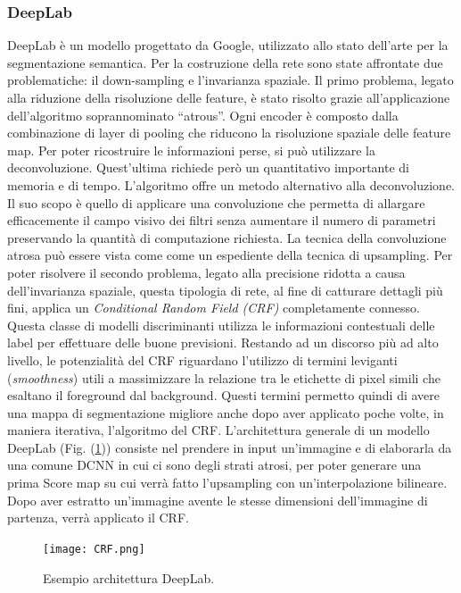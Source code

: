 \subsubsection{DeepLab}\label{DeepL}
DeepLab è un modello progettato da Google, utilizzato allo stato dell'arte 
per la segmentazione semantica. Per la costruzione della rete sono state 
affrontate due problematiche: il down-sampling e l'invarianza spaziale. Il 
primo problema, legato alla riduzione della risoluzione delle feature, è stato 
risolto grazie all'applicazione dell'algoritmo soprannominato “atrous”. Ogni 
encoder è composto dalla combinazione di layer di pooling che riducono 
la risoluzione spaziale delle feature map. Per poter ricostruire le informazioni 
perse, si può utilizzare la deconvoluzione. Quest'ultima richiede però un 
quantitativo importante di memoria e di tempo. L'algoritmo offre un 
metodo alternativo alla deconvoluzione. Il suo scopo è quello di applicare 
una convoluzione che permetta di allargare efficacemente il campo visivo 
dei filtri senza aumentare il numero di parametri preservando la quantità di 
computazione richiesta. La tecnica della convoluzione atrosa può essere vista 
come come un espediente della tecnica di upsampling. Per poter risolvere 
il secondo problema, legato alla precisione ridotta a causa dell'invarianza 
spaziale, questa tipologia di rete, al fine di catturare dettagli più fini, applica 
un \emph{Conditional Random Field (CRF)} completamente connesso. Questa 
classe di modelli discriminanti utilizza le informazioni contestuali delle label 
per effettuare delle buone previsioni. Restando ad un discorso più ad alto livello, 
le potenzialità del CRF riguardano l'utilizzo di termini leviganti 
(\emph{smoothness}) utili a massimizzare la relazione tra le etichette di pixel 
simili che esaltano il foreground dal background. Questi termini permetto quindi di 
avere una mappa di segmentazione migliore anche dopo aver applicato poche 
volte, in maniera iterativa, l'algoritmo del CRF. L'architettura generale di un 
modello DeepLab (Fig. (\ref{CRF})) consiste nel prendere in input un'immagine 
e di elaborarla da una comune DCNN in cui ci sono degli strati atrosi, per 
poter generare una prima Score map su cui verrà fatto l'upsampling con 
un'interpolazione bilineare. Dopo aver estratto un'immagine avente le stesse 
dimensioni dell'immagine di partenza, verrà applicato il CRF.
\begin{figure}
    \centering
    \texttt{[image: CRF.png]}
    \centering
    \caption{Esempio architettura DeepLab.}
    \label{CRF}
\end{figure}

